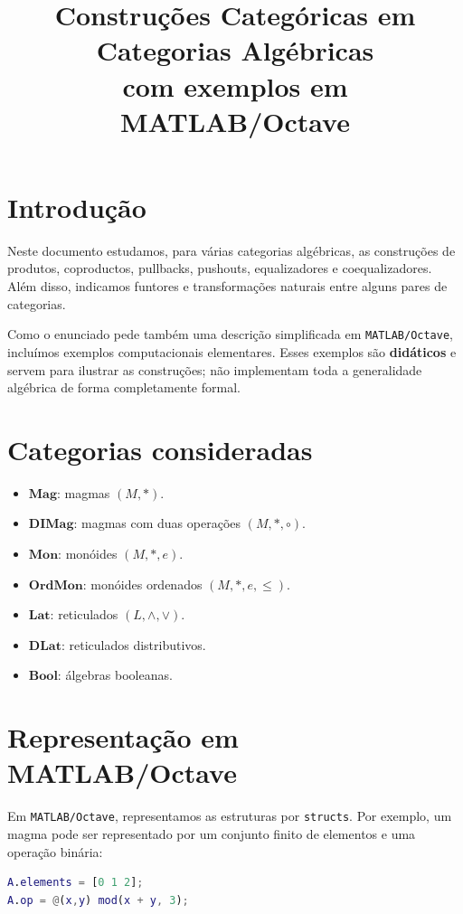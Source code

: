 \documentclass[a4paper,12pt]{article}
\title{Construções Categóricas em Categorias Algébricas\\
\large com exemplos em MATLAB/Octave}
\author{}
\date{}
\begin{document}
\maketitle

\section*{Introdução}

Neste documento estudamos, para várias categorias algébricas, as construções de
produtos, coproductos, pullbacks, pushouts, equalizadores e coequalizadores.
Além disso, indicamos funtores e transformações naturais entre alguns pares de
categorias.

Como o enunciado pede também uma descrição simplificada em \texttt{MATLAB/Octave},
incluímos exemplos computacionais elementares. Esses exemplos são
\textbf{didáticos} e servem para ilustrar as construções; não implementam toda a
generalidade algébrica de forma completamente formal.

\section*{Categorias consideradas}

\begin{itemize}
    \item $\mathbf{Mag}$: magmas $(M,\ast)$.
    \item $\mathbf{DIMag}$: magmas com duas operações $(M,\ast,\circ)$.
    \item $\mathbf{Mon}$: monóides $(M,\ast,e)$.
    \item $\mathbf{OrdMon}$: monóides ordenados $(M,\ast,e,\le)$.
    \item $\mathbf{Lat}$: reticulados $(L,\wedge,\vee)$.
    \item $\mathbf{DLat}$: reticulados distributivos.
    \item $\mathbf{Bool}$: álgebras booleanas.
\end{itemize}

\section*{Representação em MATLAB/Octave}

Em \texttt{MATLAB/Octave}, representamos as estruturas por \texttt{structs}. Por
exemplo, um magma pode ser representado por um conjunto finito de elementos e uma
operação binária:

\begin{lstlisting}[language=Matlab]
% Exemplo de magma
A.elements = [0 1 2];
A.op = @(x,y) mod(x + y, 3);
\end{lstlisting}
\end{document}

